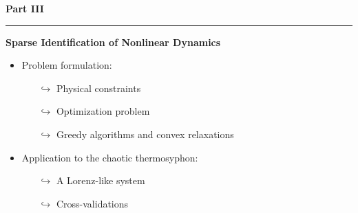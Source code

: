 
\begin{frame}[t, c]{}{}
  \begin{minipage}{.48\textwidth}
    \centering
  \end{minipage}%
  \hfill
  \begin{minipage}{.48\textwidth}
    \centering
    {
      \Large\textbf{Part III}
    }
    
    \bigskip
    
    \rule{\textwidth}{0.001\textwidth}
    
    \bigskip
    
    {
      \large
      \textbf{Sparse Identification of Nonlinear Dynamics}
    }
    
    \medskip
    
    \begin{itemize}
    \item Problem formulation:
      \begin{itemize}
      \item[\(	\hookrightarrow	\)] Physical constraints
      \item[\(	\hookrightarrow	\)] Optimization problem
      \item[\(	\hookrightarrow	\)] Greedy algorithms and convex relaxations
      \end{itemize}
      
      \medskip
      
    \item Application to the chaotic thermosyphon:
      \begin{itemize}
      \item[\(	\hookrightarrow	\)] A Lorenz-like system
      \item[\(	\hookrightarrow	\)] Cross-validations
      \end{itemize}
      
    \end{itemize}
    
  \end{minipage}
\end{frame}

